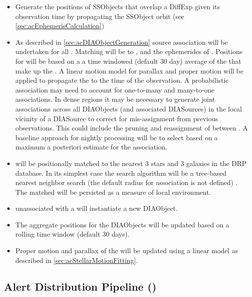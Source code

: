 \begin{itemize}
\item Generate the positions of SSObjects that overlap a DiffExp given its observation time by propagating the SSObject orbit (see \ref{sec:acEphemerisCalculation}) 
\item As described in \ref{sec:acDIAObjectGeneration} source association will be undertaken for all \DIASources. Matching will be to \DIAObjects, and the ephemerides of \SSObjects. Positions for \DIAObjects will be based on a a time windowed (default 30 day) average of the \DIASources that make up the \DIAObject. A linear motion model for parallax and proper motion will be applied to propagate the \DIAObject to the time of the observation. A probabilistic association may need to account for one-to-many and many-to-one associations.  In dense regions it may be necessary to generate joint associations across all DIAObjects (and associated DIASources) in the local  vicinity of a DIASource to correct for mis-assignment from previous observations. This could include the pruning and reassignment of \DIASources between \DIAObjects. A baseline approach for nightly processing will be to select based on a maximum a posteriori estimate for the association.
\item \DIASources will be positionally matched to the nearest 3 stars and 3 galaxies in the DRP \Object database. In its simplest case the search algorithm will be a tree-based nearest neighbor search (the default radius for association is not defined) . The matched \Objects will be persisted as a measure of local environment. 
\item \DIASources unassociated with a \DIAObject will instantiate a new DIAObject.
\item The aggregate positions for the DIAObjects will be updated based on a rolling time window (default 30 days). 
\item Proper motion and parallax of the \DIAObject will be updated using a linear model as described in \ref{sec:acStellarMotionFitting}. 
\end{itemize}


\clearpage

\subsection{Alert Distribution Pipeline (\wbsAP)}

